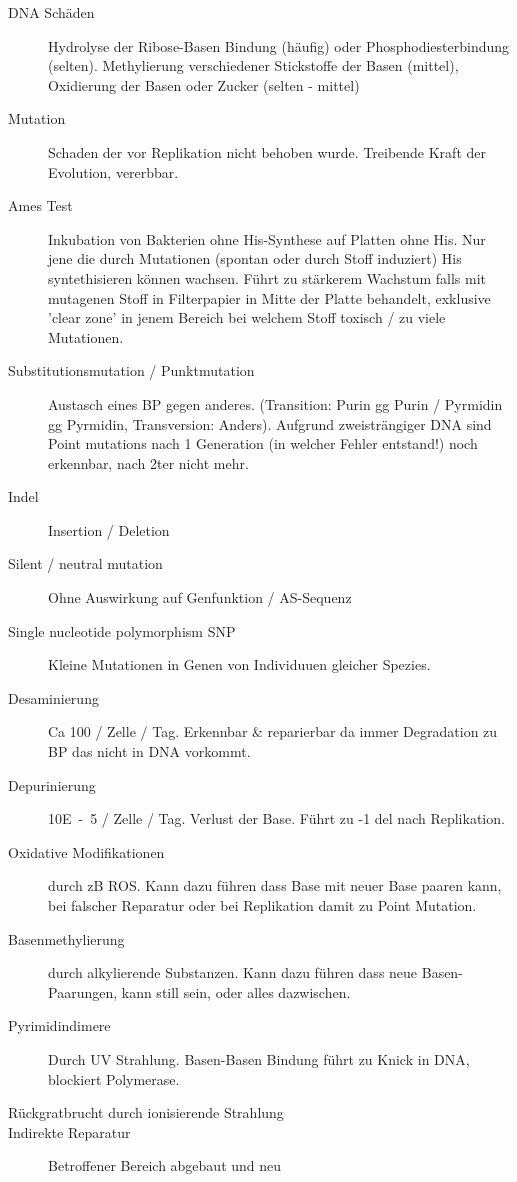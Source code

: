 \documentclass[a4paper,twocolumn,usegeometry,english,fontsize=5,DIV=28]{scrartcl}
\begin{document}
\begin{description}
	\item[DNA Schäden] Hydrolyse der Ribose-Basen Bindung (häufig) oder
		Phosphodiesterbindung (selten). Methylierung verschiedener
		Stickstoffe der Basen (mittel), Oxidierung der Basen oder
		Zucker (selten - mittel)
	\item[Mutation] Schaden der vor Replikation nicht behoben wurde. Treibende Kraft der Evolution, vererbbar.
	\item[Ames Test] Inkubation von Bakterien ohne His-Synthese auf Platten
		ohne His. Nur jene die durch Mutationen (spontan oder durch
		Stoff induziert) His syntethisieren können wachsen. Führt zu
		stärkerem Wachstum falls mit mutagenen Stoff in Filterpapier in
		Mitte der Platte behandelt, exklusive 'clear zone' in jenem
		Bereich bei welchem Stoff toxisch / zu viele Mutationen.
	\item[Substitutionsmutation / Punktmutation] Austasch eines BP gegen
		anderes. (Transition: Purin gg Purin / Pyrmidin gg Pyrmidin,
		Transversion: Anders). Aufgrund zweisträngiger DNA sind Point
		mutations nach 1 Generation (in welcher Fehler entstand!) noch
		erkennbar, nach 2ter nicht mehr.
	\item[Indel] Insertion / Deletion
	\item[Silent / neutral mutation] Ohne Auswirkung auf Genfunktion / AS-Sequenz
	\item[Single nucleotide polymorphism SNP] Kleine Mutationen in Genen
		von Individuuen gleicher Spezies.
	\item[Desaminierung] Ca 100 / Zelle / Tag. Erkennbar \& reparierbar da
		immer Degradation zu BP das nicht in DNA vorkommt.
	\item[Depurinierung] \si{10E-5} / Zelle / Tag. Verlust der Base. Führt
		zu -1 del nach Replikation.
	\item[Oxidative Modifikationen] durch zB ROS. Kann dazu führen dass
		Base mit neuer Base paaren kann, bei falscher Reparatur oder
		bei Replikation damit zu Point Mutation.
	\item[Basenmethylierung] durch alkylierende Substanzen. Kann dazu
		führen dass neue Basen-Paarungen, kann still sein, oder alles
		dazwischen.
	\item[Pyrimidindimere] Durch UV Strahlung. Basen-Basen Bindung führt zu
		Knick in DNA, blockiert Polymerase.
	\item[Rückgratbrucht durch ionisierende Strahlung]
	\item[Indirekte Reparatur] Betroffener Bereich abgebaut und neu

\end{description}
\end{document}
